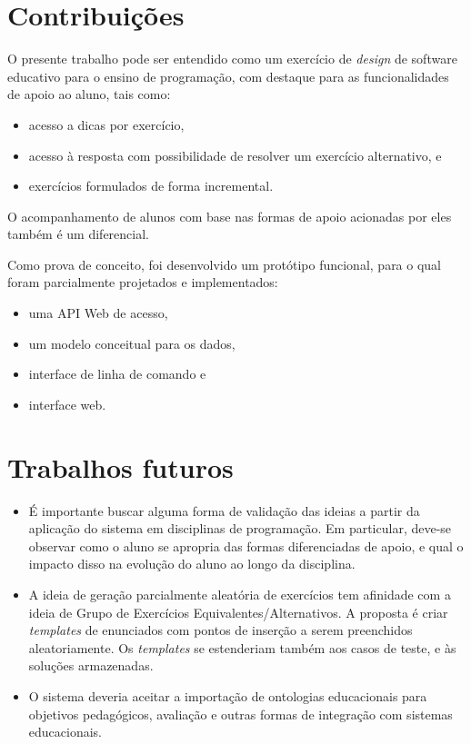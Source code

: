 \section{Contribuições}
O presente trabalho pode ser entendido como um exercício de \emph{design} de software educativo para o ensino de programação, com destaque para as funcionalidades de apoio ao aluno, tais como: 
\begin{itemize}
    \item acesso a dicas por exercício, 
    \item acesso à resposta com possibilidade de resolver um exercício alternativo, e 
    \item exercícios formulados de forma incremental.
\end{itemize}
O acompanhamento de alunos com base nas formas de apoio acionadas por eles também é um diferencial.

Como prova de conceito, foi desenvolvido um protótipo funcional, para o qual foram parcialmente projetados e implementados: 
\begin{itemize}
    \item uma API Web de acesso, 
    \item um modelo conceitual para os dados, 
    \item interface de linha de comando e 
    \item interface web.
\end{itemize}
\section{Trabalhos futuros}
\begin{itemize}
    \item É importante buscar alguma forma de validação das ideias a partir da aplicação do sistema em disciplinas de programação.
    Em particular, deve-se observar como o aluno se apropria das formas diferenciadas de apoio, e qual o impacto disso na evolução do aluno ao longo da disciplina.
    \item A ideia de geração parcialmente aleatória de exercícios tem afinidade com a ideia de Grupo de Exercícios Equivalentes/Alternativos. A proposta é criar \emph{templates} de enunciados com pontos de inserção a serem preenchidos aleatoriamente. Os \emph{templates} se estenderiam também aos casos de teste, e às soluções armazenadas.
    \item O sistema deveria aceitar a importação de ontologias educacionais para objetivos pedagógicos, avaliação e outras formas de integração com sistemas educacionais.
\end{itemize}

